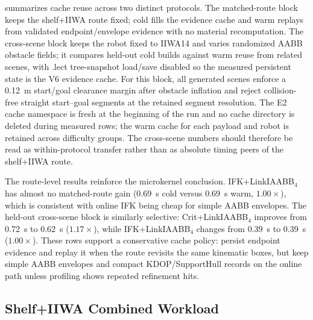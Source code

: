\documentclass[journal]{IEEEtran}
\begin{document}
 summarizes cache reuse across two distinct
protocols. The matched-route block keeps the shelf+IIWA route fixed; cold fills
the evidence cache and warm replays from validated endpoint/envelope evidence with no
material recomputation. The cross-scene block keeps the robot fixed to IIWA14 and varies
randomized AABB obstacle fields; it compares held-out cold builds against
warm reuse from related scenes, with .lect tree-snapshot load/save disabled so
the measured persistent state is the V6 evidence cache. For this block, all
generated scenes enforce a 0.12~m start/goal clearance margin after obstacle
inflation and reject collision-free straight start--goal segments at the
retained segment resolution. The E2 cache namespace is fresh at the beginning of the run and no
cache directory is deleted during measured rows; the warm cache for each
payload and robot is retained across difficulty groups. The cross-scene numbers
should therefore be read as within-protocol transfer rather than as absolute
timing peers of the shelf+IIWA route.

The route-level results reinforce the microkernel conclusion. IFK+LinkIAABB$_4$
has almost no matched-route gain (0.69~s cold versus 0.69~s warm,
$1.00\times$), which is consistent with online IFK being cheap for simple AABB
envelopes. The held-out cross-scene block is similarly selective: Crit+LinkIAABB$_4$
improves from 0.72~s to 0.62~s ($1.17\times$), while IFK+LinkIAABB$_4$ changes
from 0.39~s to 0.39~s ($1.00\times$). These rows support a conservative cache
policy: persist endpoint evidence and replay it when the route revisits the
same kinematic boxes, but keep simple AABB envelopes and compact KDOP/SupportHull
records on the online path unless profiling shows repeated refinement hits.

\FloatBarrier
\clearpage

\subsection{Shelf+IIWA Combined Workload}\label{sec:exp_e2e}


\end{document}
